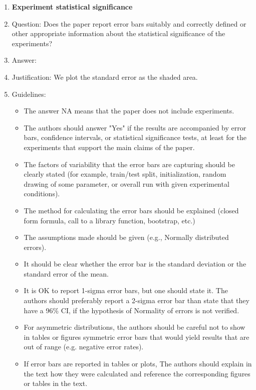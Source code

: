 \documentclass{article}
\theoremstyle{plain}
\begin{document}
\begin{enumerate}
\item {\bf Experiment statistical significance}
    \item[] Question: Does the paper report error bars suitably and correctly defined or other appropriate information about the statistical significance of the experiments?
    \item[] Answer: \answerYes{}
    \item[] Justification: We plot the standard error as the shaded area.
    \item[] Guidelines:
    \begin{itemize}
        \item The answer NA means that the paper does not include experiments.
        \item The authors should answer "Yes" if the results are accompanied by error bars, confidence intervals, or statistical significance tests, at least for the experiments that support the main claims of the paper.
        \item The factors of variability that the error bars are capturing should be clearly stated (for example, train/test split, initialization, random drawing of some parameter, or overall run with given experimental conditions).
        \item The method for calculating the error bars should be explained (closed form formula, call to a library function, bootstrap, etc.)
        \item The assumptions made should be given (e.g., Normally distributed errors).
        \item It should be clear whether the error bar is the standard deviation or the standard error of the mean.
        \item It is OK to report 1-sigma error bars, but one should state it. The authors should preferably report a 2-sigma error bar than state that they have a 96\% CI, if the hypothesis of Normality of errors is not verified.
        \item For asymmetric distributions, the authors should be careful not to show in tables or figures symmetric error bars that would yield results that are out of range (e.g. negative error rates).
        \item If error bars are reported in tables or plots, The authors should explain in the text how they were calculated and reference the corresponding figures or tables in the text.
    \end{itemize}


\end{enumerate}
\end{document}
